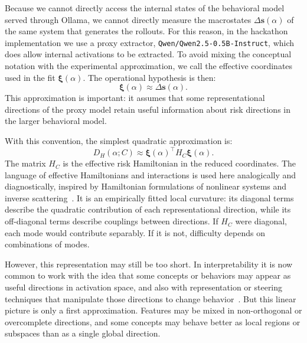 \documentclass[10pt,twocolumn]{article}
\newcommand{\Dham}{D_{H}}
\newcommand{\cond}{C}
\newcommand{\xrep}{\bm{\xi}}
\newcommand{\deltas}{\Delta\bm{s}}
\begin{document}
Because we cannot directly access the internal states of the behavioral model served through Ollama, we cannot directly measure the macrostates \(\deltas(\alpha)\) of the same system that generates the rollouts. For this reason, in the hackathon implementation we use a proxy extractor, \texttt{Qwen/Qwen2.5-0.5B-Instruct}, which does allow internal activations to be extracted. To avoid mixing the conceptual notation with the experimental approximation, we call the effective coordinates used in the fit \(\xrep(\alpha)\). The operational hypothesis is then:
\[
\xrep(\alpha)\approx\deltas(\alpha).
\]
This approximation is important: it assumes that some representational directions of the proxy model retain useful information about risk directions in the larger behavioral model.

With this convention, the simplest quadratic approximation is:
\[
\Dham(\alpha;\cond)
\approx
\xrep(\alpha)^{\top}
H_{\cond}
\xrep(\alpha).
\]
The matrix \(H_{\cond}\) is the effective risk Hamiltonian in the reduced coordinates. The language of effective Hamiltonians and interactions is used here analogically and diagnostically, inspired by Hamiltonian formulations of nonlinear systems and inverse scattering~\cite{zakharov1972exact,faddeev2007hamiltonian}. It is an empirically fitted local curvature: its diagonal terms describe the quadratic contribution of each representational direction, while its off-diagonal terms describe couplings between directions. If \(H_{\cond}\) were diagonal, each mode would contribute separably. If it is not, difficulty depends on combinations of modes.

However, this representation may still be too short. In interpretability it is now common to work with the idea that some concepts or behaviors may appear as useful directions in activation space, and also with representation or steering techniques that manipulate those directions to change behavior~\cite{zou2023representation}. But this linear picture is only a first approximation. Features may be mixed in non-orthogonal or overcomplete directions, and some concepts may behave better as local regions or subspaces than as a single global direction.
\end{document}
